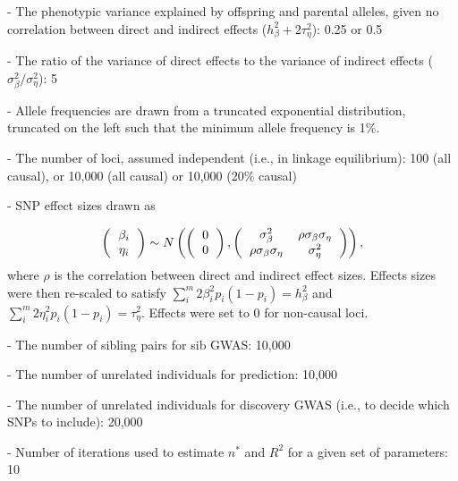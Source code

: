 \documentclass[hidelinks, 12pt]{article}
\begin{document}
- The phenotypic variance explained by offspring and parental alleles, given no correlation between direct and indirect effects ($h_{\beta}^2+2\tau_{\eta}^2$): 0.25 or 0.5

- The ratio of the variance of direct effects to the variance of indirect effects ($\sigma_{\beta}^2/\sigma_{\eta}^2$): 5

- Allele frequencies are drawn from a truncated exponential distribution, truncated on the left such that the minimum allele frequency is 1\%.

- The number of loci, assumed independent (i.e., in linkage equilibrium): 100 (all causal), or 10,000 (all causal) or 10,000 (20\% causal)

- SNP effect sizes drawn as 

\[ 
\left (
  \begin{tabular}{c}
  $\beta_{i}$ \\
  $\eta_{i}$
  \end{tabular}
\right ) \sim N
\left ( \left (
  \begin{tabular}{c}
  $0$ \\
  $0$
  \end{tabular}
\right ),
\left (
  \begin{tabular}{cc}
  $\sigma_{\beta}^2$ & $\rho \sigma_{\beta} \sigma_{\eta}$  \\
  $\rho \sigma_{\beta} \sigma_{\eta}$ & $\sigma_{\eta}^2$ 
  \end{tabular}
\right )\right ), 
\] 
where $\rho$ is the correlation between direct and indirect effect sizes. Effects sizes were then re-scaled to satisfy $\sum_i^m2\beta_i^2p_i(1-p_i)=h_{\beta}^2$ and $\sum_i^m2\eta_i^2p_i(1-p_i)=\tau_{\eta}^2$. Effects were set to 0 for non-causal loci.

- The number of sibling pairs for sib GWAS: 10,000

- The number of unrelated individuals for prediction: 10,000

- The number of unrelated individuals for discovery GWAS (i.e., to decide which SNPs to include): 20,000

- Number of iterations used to estimate $n^*$ and $R^2$ for a given set of parameters: 10


\pagebreak
\end{document}

